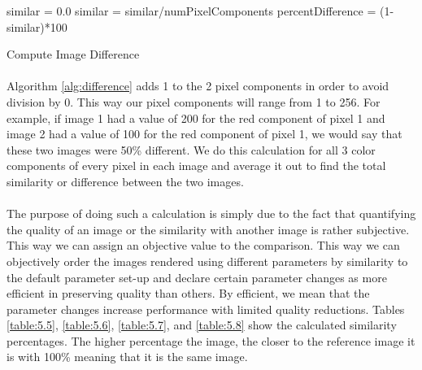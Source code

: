 \vspace{10 mm}
\begin{algorithm}[H]
 \SetAlgoLined
 similar = 0.0\;
 similar = similar/numPixelComponents\;
 percentDifference = (1-similar)*100\;
 \caption{Compute Image Difference}
 \label{alg:difference}
\end{algorithm}

\paragraph{}
Algorithm \ref{alg:difference} adds 1 to the 2 pixel components in order to avoid division by 0.  This way our pixel components will range from 1 to 256.  For example, if image 1 had a value of 200 for the red component of pixel 1 and image 2 had a value of 100 for the red component of pixel 1, we would say that these two images were 50\% different.  We do this calculation for all 3 color components of every pixel in each image and average it out to find the total similarity or difference between the two images.

\paragraph{}
The purpose of doing such a calculation is simply due to the fact that quantifying the quality of an image or  the similarity with another image is rather subjective.  This way we can assign an objective value to the comparison.  This way we can objectively order the images rendered using different parameters by similarity to the default parameter set-up and declare certain parameter changes as more efficient in preserving quality than others.  By efficient, we mean that the parameter changes increase performance with limited quality reductions.  Tables \ref{table:5.5}, \ref{table:5.6}, \ref{table:5.7}, and \ref{table:5.8} show the calculated similarity percentages.  The higher percentage the image, the closer to the reference image it is with 100\% meaning that it is the same image.

